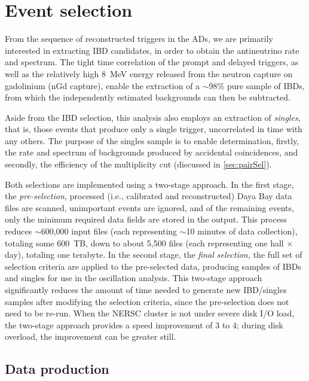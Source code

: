 \documentclass[../thesis.tex]{subfiles}
\begin{document}
\chapter{Event selection}
\label{chap:selection}


From the sequence of reconstructed triggers in the ADs, we are primarily interested in extracting IBD candidates, in order to obtain the antineutrino rate and spectrum. The tight time correlation of the prompt and delayed triggers, as well as the relatively high 8~MeV energy released from the neutron capture on gadolinium (nGd capture), enable the extraction of a $\sim$98\% pure sample of IBDs, from which the independently estimated backgrounds can then be subtracted.

Aside from the IBD selection, this analysis also employs an extraction of \emph{singles,} that is, those events that produce only a single trigger, uncorrelated in time with any others. The purpose of the singles sample is to enable determination, firstly, the rate and spectrum of backgrounds produced by accidental coincidences, and secondly, the efficiency of the multiplicity cut (discussed in \autoref{sec:pairSel}).

Both selections are implemented using a two-stage approach. In the first stage, the \emph{pre-selection,} processed (i.e., calibrated and reconstructed) Daya Bay data files are scanned, unimportant events are ignored, and of the remaining events, only the minimum required data fields are stored in the output. This process reduces $\sim$600,000 input files (each representing $\sim$10 minutes of data collection), totaling some 600~TB, down to about 5,500 files (each representing one hall $\times$ day), totaling one terabyte. In the second stage, the \emph{final selection,} the full set of selection criteria are applied to the pre-selected data, producing samples of IBDs and singles for use in the oscillation analysis. This two-stage approach significantly reduces the amount of time needed to generate new IBD/singles samples after modifying the selection criteria, since the pre-selection does not need to be re-run. When the NERSC cluster is not under severe disk I/O load, the two-stage approach provides a speed improvement of 3 to 4; during disk overload, the improvement can be greater still.

\section{Data production}
\label{sec:selProd}
\end{document}
